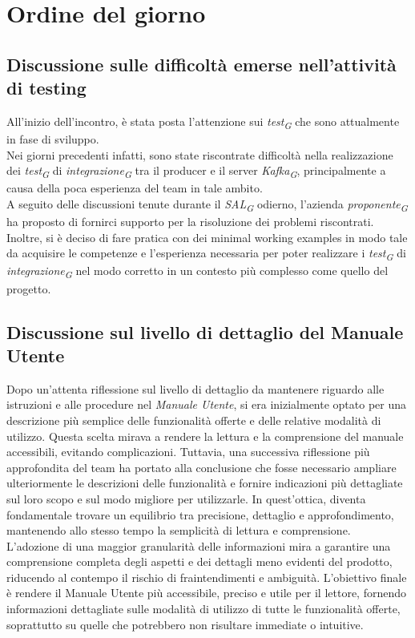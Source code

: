 \documentclass{article}
\begin{document}
\section{Ordine del giorno}
    \subsection{Discussione sulle difficoltà emerse nell'attività di testing}
    All'inizio dell'incontro, è stata posta l'attenzione sui \textit{test}\textsubscript{\textit{G}} che sono attualmente in fase di sviluppo. \\
    Nei giorni precedenti infatti, sono state riscontrate difficoltà nella realizzazione dei \textit{test}\textsubscript{\textit{G}} di \textit{integrazione}\textsubscript{\textit{G}} tra il producer e il server \textit{Kafka}\textsubscript{\textit{G}}, principalmente a causa della poca esperienza del team in tale ambito. \\
    A seguito delle discussioni tenute durante il \textit{SAL}\textsubscript{\textit{G}} odierno, l'azienda \textit{proponente}\textsubscript{\textit{G}} ha proposto di fornirci supporto per la risoluzione dei problemi riscontrati. Inoltre, si è deciso di fare pratica con dei minimal working examples in modo tale da acquisire le competenze e l'esperienza necessaria per poter realizzare i \textit{test}\textsubscript{\textit{G}} di \textit{integrazione}\textsubscript{\textit{G}} nel modo corretto in un contesto più complesso come quello del progetto.

    \subsection{Discussione sul livello di dettaglio del Manuale Utente}
    Dopo un'attenta riflessione sul livello di dettaglio da mantenere riguardo alle istruzioni e alle procedure nel \textit{Manuale Utente}, si era inizialmente optato per una descrizione più semplice delle funzionalità offerte e delle relative modalità di utilizzo. Questa scelta mirava a rendere la lettura e la comprensione del manuale accessibili, evitando complicazioni. Tuttavia, una successiva riflessione più approfondita del team ha portato alla conclusione che fosse necessario ampliare ulteriormente le descrizioni delle funzionalità e fornire indicazioni più dettagliate sul loro scopo e sul modo migliore per utilizzarle. In quest'ottica, diventa fondamentale trovare un equilibrio tra precisione, dettaglio e approfondimento, mantenendo allo stesso tempo la semplicità di lettura e comprensione. \\
    L'adozione di una maggior granularità delle informazioni mira a garantire una comprensione completa degli aspetti e dei dettagli meno evidenti del prodotto, riducendo al contempo il rischio di fraintendimenti e ambiguità. L'obiettivo finale è rendere il Manuale Utente più accessibile, preciso e utile per il lettore, fornendo informazioni dettagliate sulle modalità di utilizzo di tutte le funzionalità offerte, soprattutto su quelle che potrebbero non risultare immediate o intuitive.
\end{document}
